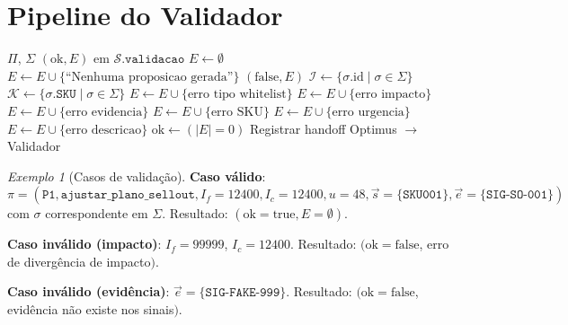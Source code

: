 \documentclass[a4paper, 12pt]{report}
\theoremstyle{definition}
\theoremstyle{remark}
\newtheorem{exemplo}{Exemplo}[chapter]
\newcommand{\sku}{\texttt{SKU}}
\newcommand{\state}{\mathcal{S}}
\begin{document}
\section{Pipeline do Validador}

\begin{algorithm}[H]
\caption{Validador -- Verifica\c{c}\~ao Determin\'istica}
\begin{algorithmic}[1]
  \Require $\Pi$, $\Sigma$
  \Ensure $(\text{ok}, E)$ em $\state.\texttt{validacao}$
  \State $E \gets \emptyset$
    \State $E \gets E \cup \{\text{``Nenhuma proposicao gerada''}\}$
    \State \Return $(\text{false}, E)$
  \EndIf
  \State $\mathcal{I} \gets \{\sigma.\text{id} \mid \sigma \in \Sigma\}$
  \State $\mathcal{K} \gets \{\sigma.\sku \mid \sigma \in \Sigma\}$
      \State $E \gets E \cup \{\text{erro tipo whitelist}\}$
    \EndIf
      \State $E \gets E \cup \{\text{erro impacto}\}$
    \EndIf
       \State $E \gets E \cup \{\text{erro evidencia}\}$ \EndIf
    \EndFor
        \State $E \gets E \cup \{\text{erro SKU}\}$
      \EndIf
    \EndFor
     \State $E \gets E \cup \{\text{erro urgencia}\}$ \EndIf
     \State $E \gets E \cup \{\text{erro descricao}\}$ \EndIf
  \EndFor
  \State $\text{ok} \gets (|E| = 0)$
  \State Registrar handoff Optimus $\to$ Validador
\end{algorithmic}
\end{algorithm}

\begin{exemplo}[Casos de valida\c{c}\~ao]
  \textbf{Caso v\'alido}: $\pi = (\texttt{P1}, \texttt{ajustar\_plano\_sellout},
  I_f=12400, I_c=12400, u=48, \vec{s}=\{\texttt{SKU001}\},
  \vec{e}=\{\texttt{SIG-SO-001}\})$ com $\sigma$ correspondente em $\Sigma$.
  Resultado: $(\text{ok}=\text{true}, E=\emptyset)$.

  \textbf{Caso inv\'alido (impacto)}: $I_f=99999$, $I_c=12400$.
  Resultado: $(\text{ok}=\text{false}$, erro de diverg\^encia de impacto$)$.

  \textbf{Caso inv\'alido (evid\^encia)}: $\vec{e}=\{\texttt{SIG-FAKE-999}\}$.
  Resultado: $(\text{ok}=\text{false}$, evid\^encia n\~ao existe nos sinais$)$.
\end{exemplo}
\end{document}
